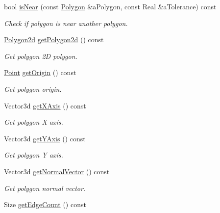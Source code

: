\begin{DoxyCompactItemize}
bool \hyperlink{classostk_1_1math_1_1geom_1_1d3_1_1objects_1_1_polygon_a6bea447ecf86a3cf9499146d9f139d1d}{is\+Near} (const \hyperlink{classostk_1_1math_1_1geom_1_1d3_1_1objects_1_1_polygon}{Polygon} \&a\+Polygon, const Real \&a\+Tolerance) const
\begin{DoxyCompactList}\small\item\em Check if polygon is near another polygon. \end{DoxyCompactList}\item 
\hyperlink{namespaceostk_1_1math_1_1geom_1_1d3_1_1objects_ab51647b491a750a403dcaca4c2254905}{Polygon2d} \hyperlink{classostk_1_1math_1_1geom_1_1d3_1_1objects_1_1_polygon_a8a913803b3effdadc1072a1ae50fe827}{get\+Polygon2d} () const
\begin{DoxyCompactList}\small\item\em Get polygon 2D polygon. \end{DoxyCompactList}\item 
\hyperlink{classostk_1_1math_1_1geom_1_1d3_1_1objects_1_1_point}{Point} \hyperlink{classostk_1_1math_1_1geom_1_1d3_1_1objects_1_1_polygon_a5f5c92cc505de7264e041c799df9c8b8}{get\+Origin} () const
\begin{DoxyCompactList}\small\item\em Get polygon origin. \end{DoxyCompactList}\item 
Vector3d \hyperlink{classostk_1_1math_1_1geom_1_1d3_1_1objects_1_1_polygon_a6ed413b82f3a145de4babbb9f6a9fd34}{get\+X\+Axis} () const
\begin{DoxyCompactList}\small\item\em Get polygon X axis. \end{DoxyCompactList}\item 
Vector3d \hyperlink{classostk_1_1math_1_1geom_1_1d3_1_1objects_1_1_polygon_a5cbf59e18a05f4cf31e02fad31df1c03}{get\+Y\+Axis} () const
\begin{DoxyCompactList}\small\item\em Get polygon Y axis. \end{DoxyCompactList}\item 
Vector3d \hyperlink{classostk_1_1math_1_1geom_1_1d3_1_1objects_1_1_polygon_a5368f76bf510c686820d493d8c6f510f}{get\+Normal\+Vector} () const
\begin{DoxyCompactList}\small\item\em Get polygon normal vector. \end{DoxyCompactList}\item 
Size \hyperlink{classostk_1_1math_1_1geom_1_1d3_1_1objects_1_1_polygon_a7872da49911dc99d02a748dc446a49d0}{get\+Edge\+Count} () const

\end{DoxyCompactItemize}

